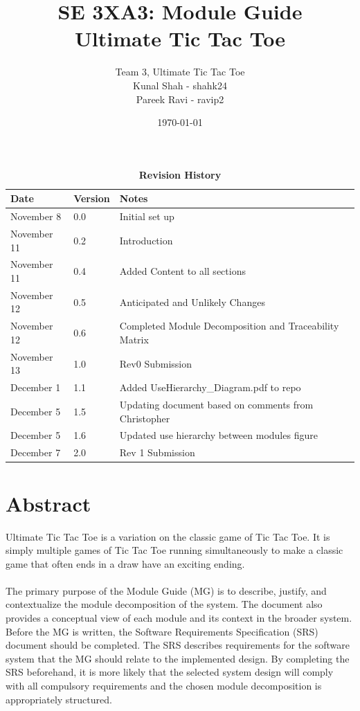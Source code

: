 \documentclass[12pt, titlepage]{article}
\title{SE 3XA3: Module Guide\\Ultimate Tic Tac Toe}
\author{Team 3, Ultimate Tic Tac Toe
		\\ Kunal Shah - shahk24
		\\ Pareek Ravi - ravip2
}
\date{\today}
\begin{document}
\maketitle


\tableofcontents
\listoftables
\listoffigures


\newpage
\begin{table}[hp]
\caption{\bf Revision History}
\begin{tabularx}{\textwidth}{llX}
\toprule {\bf Date} & {\bf Version} & {\bf Notes}\\
\midrule
November 8  & 0.0 & Initial set up\\
November 11 & 0.2 & Introduction \\
November 11 & 0.4 & Added Content to all sections \\
November 12 & 0.5 & Anticipated and Unlikely Changes\\ 
November 12 & 0.6 & Completed Module Decomposition and Traceability Matrix\\ 
November 13 & 1.0 & Rev0 Submission\\
December 1 & 1.1 & Added UseHierarchy\_Diagram.pdf to repo\\
December 5 & 1.5 & Updating document based on comments from Christopher \\
December 5 & 1.6 & Updated use hierarchy between modules figure\\
December 7 & 2.0 & Rev 1 Submission \\
\bottomrule
\end{tabularx}
\end{table}
\newpage

\section*{Abstract}
Ultimate Tic Tac Toe is a variation on the classic game of Tic Tac Toe. It is 
simply multiple games of Tic Tac Toe running simultaneously to make a classic 
game that often ends in a draw have an exciting ending.\\\\
The primary purpose of the Module Guide (MG) is to describe, justify, and
contextualize the module decomposition of the system. The document also provides
a conceptual view of each module and its context in the broader system. Before
the MG is written, the Software Requirements Specification (SRS) document should
be completed. The SRS describes requirements for the software system that the MG
should relate to the implemented design. By completing the SRS beforehand, it
is more likely that the selected system design will comply with all compulsory
requirements and the chosen module decomposition is appropriately structured.
\end{document}
